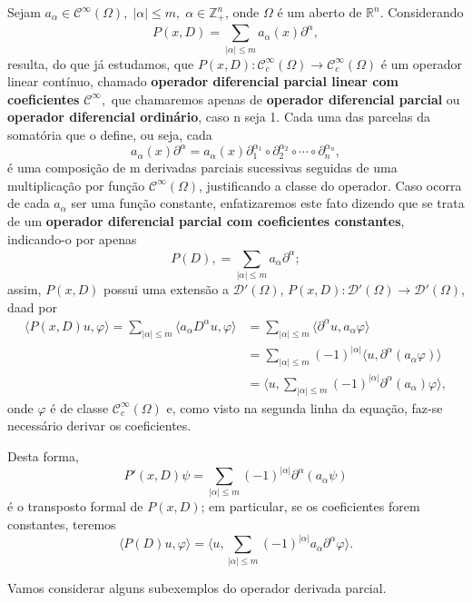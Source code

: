 \documentclass[../distribution_theory_notes.tex]{subfiles}
\begin{document}
 \begin{example}
  Sejam \(a_{\alpha }\in \mathcal{C}^{\infty}(\Omega ),\; | \alpha  |\leq m,\; \alpha \in \mathbb{Z}_{+}^{n}\), onde \(\Omega \) é um aberto de \(\mathbb{R}^{n}\). Considerando 
    \[
      P(x, D)=\sum\limits_{| \alpha  |\leq m}^{}a_{\alpha }(x)\partial^{\alpha },
    \]
    resulta, do que já estudamos, que \(P(x, D):\mathcal{C}_{c}^{\infty}(\Omega )\rightarrow \mathcal{C}_{c}^{\infty}(\Omega )\) é um operador linear contínuo, chamado \textbf{operador diferencial parcial linear com coeficientes} \(\mathcal{C}^{\infty},\) que chamaremos apenas de \textbf{operador diferencial parcial} ou \textbf{operador diferencial ordinário}, caso n seja 1. Cada uma das parcelas da somatória que o define, ou seja, cada 
      \[
        a_{\alpha }(x)\partial^{\alpha }=a_{\alpha }(x)\partial_{1}^{\alpha_{1}}\circ \partial_{2}^{\alpha_{2}}\circ\cdots\circ \partial_{n}^{\alpha_{n}},
      \]
      é uma composição de m derivadas parciais sucessivas seguidas de uma multiplicação por função \(\mathcal{C}^{\infty}(\Omega )\), justificando a classe do operador. Caso ocorra de cada \(a_{\alpha }\) ser uma função constante, enfatizaremos este fato dizendo que se trata de um \textbf{operador diferencial parcial com coeficientes constantes}, indicando-o por apenas 
        \[
          P(D), = \sum\limits_{| \alpha  |\leq m}^{}a_{\alpha }\partial^{\alpha };
        \]
        assim, \(P(x, D)\) possui uma extensão a \(\mathcal{D}'(\Omega )\), \(P(x, D):\mathcal{D}'(\Omega )\rightarrow \mathcal{D}'(\Omega )\), daad por 
       \begin{align*}
         \langle P(x, D)u, \varphi  \rangle = \sum\limits_{| \alpha  |\leq m}^{}\langle a_{\alpha }D^{\alpha }u, \varphi  \rangle &= \sum\limits_{| \alpha  |\leq m}^{}\langle \partial^{\alpha }u, a_{\alpha }\varphi  \rangle\\ 
                                                                                                                                  &= \sum\limits_{| \alpha  |\leq m}^{}(-1)^{| \alpha  |}\langle u, \partial^{\alpha }(a_{\alpha }\varphi ) \rangle\\ 
                                                                                                                                  &= \biggl\langle u, \sum\limits_{| \alpha  |\leq m}^{}(-1)^{| \alpha  |}\partial^{\alpha }(a_{\alpha })\varphi  \biggr\rangle,
       \end{align*}
       onde \(\varphi \) é de classe \(\mathcal{C}_{c}^{\infty}(\Omega )\) e, como visto na segunda linha da equação, faz-se necessário derivar os coeficientes. 

       Desta forma, 
       \[
         P'(x, D)\psi = \sum\limits_{| \alpha  |\leq m}^{}(-1)^{| \alpha  |}\partial^{\alpha }(a_{\alpha }\psi )
       \]
       é o transposto formal de \(P(x, D)\); em particular, se os coeficientes forem constantes, teremos 
         \[
           \langle P(D)u, \varphi  \rangle = \biggl\langle u, \sum\limits_{| \alpha  |\leq m}^{}(-1)^{| \alpha  |}a_{\alpha }\partial^{\alpha }\varphi  \biggr\rangle.
         \]

\end{example}
Vamos considerar alguns subexemplos do operador derivada parcial.
\end{document}
